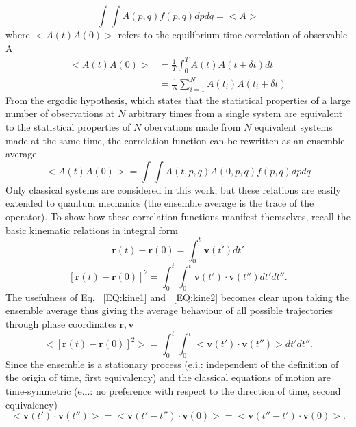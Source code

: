 \begin{equation}
\int \int A(p,q) f(p,q) dpdq=<A>
\end{equation}
where $<A(t)A(0)>$ refers to the equilibrium time correlation of observable A
\begin{equation}
\begin{split}
<A(t)A(0)>&=\frac{1}{T}\int_0^TA(t)A(t+\delta t)dt\\
&=\frac{1}{N}\sum_{i=1}^NA(t_i)A(t_i+\delta t)
\end{split}
\end{equation}
From the ergodic hypothesis, which states that the statistical properties of a large number of observations at $N$ arbitrary times from a single system are equivalent to the statistical properties of $N$ obervations made from $N$ equivalent systems made at the same time, the correlation function can be rewritten as an ensemble average \cite{mcquarrie2000statistical}
\begin{equation}
<A( t)A(0)>=\int \int A(t,p,q)A(0,p,q) f(p,q) dpdq 
\end{equation}
Only classical systems are considered in this work, but these relations are easily extended to quantum mechanics (the ensemble average is the trace of the operator). To show how these correlation functions manifest themselves, recall the basic kinematic relations in integral form
%
\begin{equation} \label{EQ:kine1}
\bm{r}(t)-\bm{r}(0)=\int_0^t \bm{v}(t')dt'
\end{equation}
\begin{equation} \label{EQ:kine2}
[\bm{r}(t)-\bm{r}(0)]^2=\int_0^t \int_0^t \bm{v}(t')\cdot\bm{v}(t'')dt'dt''.
\end{equation}
%
The usefulness of Eq. ~\ref {EQ:kine1} and ~\ref{EQ:kine2} becomes clear upon taking the ensemble average thus giving the average behaviour of all possible trajectories through phase coordinates $\bm{r},\bm{v}$
%
\begin{equation}
<[\bm{r}(t)-\bm{r}(0)]^2>=\int_0^t \int_0^t <\bm{v}(t')\cdot\bm{v}(t'')>dt'dt''.
\end{equation}
%
Since the ensemble is a stationary process (e.i.: independent of the definition of the origin of time, first equivalency) and the classical equations of motion are time-symmetric (e.i.: no preference with respect to the direction of time, second equivalency)
%
\begin{equation}
<\bm{v}(t')\cdot\bm{v}(t'')>=<\bm{v}(t'-t'')\cdot\bm{v}(0)>=<\bm{v}(t''-t')\cdot\bm{v}(0)>.
\end{equation}
